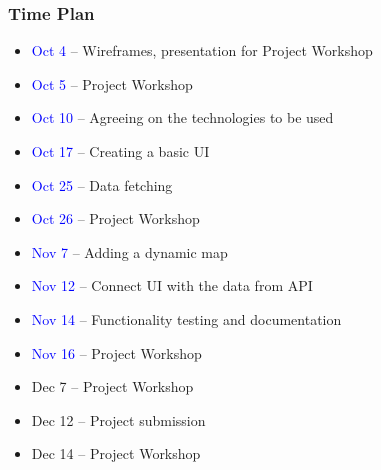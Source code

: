 \documentclass[10pt,xcolor=pdflatex,hyperref={unicode}]{beamer}
\begin{document}
\begin{frame}\frametitle{Time Plan}
    \begin{itemize}
        \item[] \textcolor{blue}{Oct 4} -- Wireframes, presentation for Project Workshop
        \item[] \textcolor{blue}{Oct 5} -- Project Workshop
        \item[] \textcolor{blue}{Oct 10} -- Agreeing on the technologies to be used
        \item[] \textcolor{blue}{Oct 17} -- Creating a basic UI
        \item[] \textcolor{blue}{Oct 25} -- Data fetching
        \item[] \textcolor{blue}{Oct 26} -- Project Workshop
        \item[] \textcolor{blue}{Nov 7}  -- Adding a dynamic map
        \item[] \textcolor{blue}{Nov 12} -- Connect UI with the data from API
        \item[] \textcolor{blue}{Nov 14} -- Functionality testing and documentation
        \item[] \textcolor{blue}{Nov 16} -- Project Workshop
        \item[] \alert{Dec 7}  -- Project Workshop
        \item[] \alert{Dec 12} -- Project submission
        \item[] \alert{Dec 14} -- Project Workshop
    \end{itemize}
\end{frame}


\end{document}
